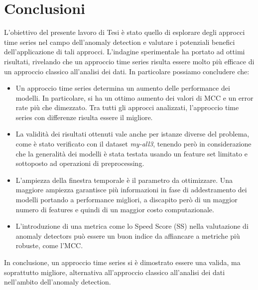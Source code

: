 \chapter{Conclusioni}

\medskip

L'obiettivo del presente lavoro di Tesi \`e stato quello di esplorare degli approcci time series nel campo dell'anomaly detection e valutare i potenziali benefici dell'applicazione di tali approcci. L'indagine sperimentale ha portato ad ottimi risultati, rivelando che un approccio time series risulta essere molto pi\`u efficace di un approccio classico all'analisi dei dati. In particolare possiamo concludere che:

\begin{itemize}

  \item Un approccio time series determina un aumento delle performance dei modelli. In particolare, si ha un ottimo aumento dei valori di MCC e un error rate pi\`u che dimezzato. Tra tutti gli approcci analizzati, l'approccio time series con differenze risulta essere il migliore.

  \item La validit\`a dei risultati ottenuti vale anche per istanze diverse del problema, come \`e stato verificato con il dataset \textit{my-all3}, tenendo per\`o in considerazione che la generalit\`a dei modelli \`e stata testata usando un feature set limitato e sottoposto ad operazioni di preprocessing.

  \item L'ampiezza della finestra temporale \`e il parametro da ottimizzare. Una maggiore ampiezza garantisce pi\`u informazioni in fase di addestramento dei modelli portando a performance migliori, a discapito per\`o di un maggior numero di features e quindi di un maggior costo computazionale.

  \item L'introduzione di una metrica come lo Speed Score (SS) nella valutazione di anomaly detectors pu\`o essere un buon indice da affiancare a metriche pi\`u robuste, come l'MCC.
    
\end{itemize}

In conclusione, un approccio time series si \`e dimostrato essere una valida, ma soprattutto migliore, alternativa all'approccio classico all'analisi dei dati nell'ambito dell'anomaly detection.

 \vspace{-0.5cm}
 \vspace{-0.3cm}